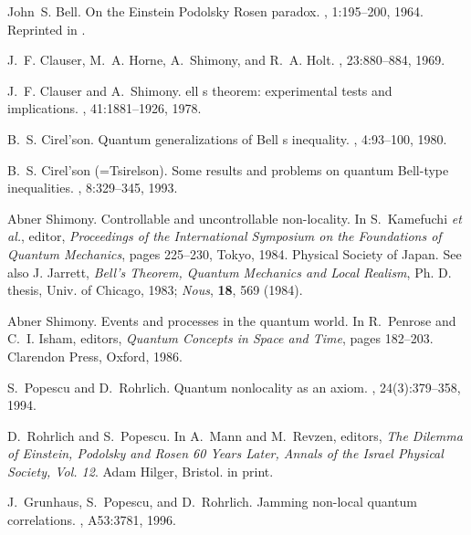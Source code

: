 \clearpage


%
%

\begin{thebibliography}{10}

John~S. Bell.
\newblock On the {E}instein {P}odolsky {R}osen paradox.
, 1:195--200, 1964.
\newblock Reprinted in \cite[pp. 403-408]{wheeler-Zurek:83}.

J.~F. Clauser, M.~A. Horne, A.~Shimony, and R.~A. Holt.
, 23:880--884, 1969.

J.~F. Clauser and A.~Shimony.
ell s theorem: experimental tests and implications.
, 41:1881--1926, 1978.

B.~S. Cirel'son.
\newblock Quantum generalizations of {B}ell s inequality.
, 4:93--100, 1980.

B.~S. {Cirel'son (=Tsirelson)}.
\newblock Some results and problems on quantum {B}ell-type inequalities.
, 8:329--345, 1993.

Abner Shimony.
\newblock Controllable and uncontrollable non-locality.
\newblock In S.~Kamefuchi {\it et al.}, editor, {\em Proceedings of the
  International Symposium on the Foundations of Quantum Mechanics}, pages
  225--230, Tokyo, 1984. Physical Society of Japan.
\newblock See also J. Jarrett, {\sl Bell's Theorem, Quantum Mechanics and Local
  Realism}, Ph. D. thesis, Univ. of Chicago, 1983; {\sl Nous}, {\bf 18}, 569
  (1984).

Abner Shimony.
\newblock Events and processes in the quantum world.
\newblock In R.~Penrose and C.~I. Isham, editors, {\em Quantum Concepts in
  Space and Time}, pages 182--203. Clarendon Press, Oxford, 1986.

S.~Popescu and D.~Rohrlich.
\newblock Quantum nonlocality as an axiom.
, 24(3):379--358, 1994.

D.~Rohrlich and S.~Popescu.
\newblock In A.~Mann and M.~Revzen, editors, {\em The Dilemma of Einstein,
  Podolsky and Rosen 60 Years Later, Annals of the Israel Physical Society,
  Vol. 12}. Adam Hilger, Bristol.
\newblock in print.

J.~Grunhaus, S.~Popescu, and D.~Rohrlich.
\newblock Jamming non-local quantum correlations.
, A53:3781, 1996.


\end{thebibliography}
